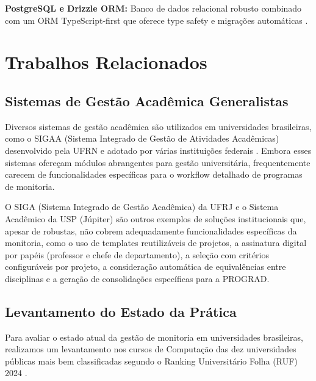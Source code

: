 \documentclass[portuguese]{sbc2025}%
\begin{document}
\textbf{PostgreSQL e Drizzle ORM:} Banco de dados relacional robusto combinado com um ORM TypeScript-first que oferece type safety e migrações automáticas \cite{PostgreSQL2024, Drizzle2024}.

\section{Trabalhos Relacionados}
\label{sec:related-work}

\subsection{Sistemas de Gestão Acadêmica Generalistas}

Diversos sistemas de gestão acadêmica são utilizados em universidades brasileiras, como o SIGAA (Sistema Integrado de Gestão de Atividades Acadêmicas) desenvolvido pela UFRN e adotado por várias instituições federais \cite{UFRN2024}. Embora esses sistemas ofereçam módulos abrangentes para gestão universitária, frequentemente carecem de funcionalidades específicas para o workflow detalhado de programas de monitoria.

O SIGA (Sistema Integrado de Gestão Acadêmica) da UFRJ e o Sistema Acadêmico da USP (Júpiter) são outros exemplos de soluções institucionais que, apesar de robustas, não cobrem adequadamente funcionalidades específicas da monitoria, como o uso de templates reutilizáveis de projetos, a assinatura digital por papéis (professor e chefe de departamento), a seleção com critérios configuráveis por projeto, a consideração automática de equivalências entre disciplinas e a geração de consolidações específicas para a PROGRAD.

\subsection{Levantamento do Estado da Prática}

Para avaliar o estado atual da gestão de monitoria em universidades brasileiras, realizamos um levantamento nos cursos de Computação das dez universidades públicas mais bem classificadas segundo o Ranking Universitário Folha (RUF) 2024 \cite{folha2024ruf}.
\end{document}
